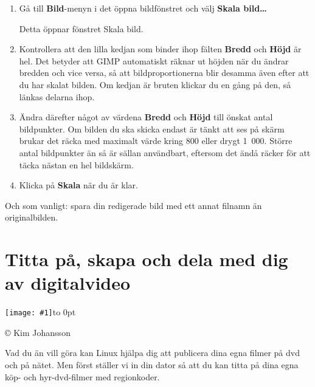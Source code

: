 \documentclass[a4paper,final]{memoir} %
\newcommand{\xrcredit}[1]{\hbox to 0pt{\hspace*{.6\baselineskip}\begin{rotate}{90}{\usefont{T1}{phv}{m}{n}\selectfont\tiny #1}\end{rotate}}}
\newcommand\xintropic[1]{{\texttt{[image: \#1]}\xrcredit{\copyright{} Kim Johansson}}\medskip}
\newcommand\xchapter[2]{\chapter{#2}\begin{center}\xintropic{#1}\end{center}}
\begin{document}
\begin{enumerate}

\item Gå till \textbf{Bild}-menyn i det öppna bildfönstret och välj \textbf{Skala bild\ldots{}}


Detta öppnar fönstret Skala bild. 

\item Kontrollera att den lilla kedjan som binder ihop fälten \textbf{Bredd} och \textbf{Höjd} är hel. Det betyder att GIMP automatiskt räknar ut höjden när du ändrar bredden och vice versa, så att bildproportionerna blir desamma även efter att du har skalat bilden. Om kedjan är bruten klickar du en gång på den, så länkas delarna ihop. 

\item Ändra därefter något av värdena \textbf{Bredd} och \textbf{Höjd} till önskat antal bildpunkter. Om bilden du ska skicka endast är tänkt att ses på skärm brukar det räcka med maximalt värde kring 800 eller drygt 1~000. Större antal bildpunkter än så är sällan användbart, eftersom det ändå räcker för att täcka nästan en hel bildskärm.

\item Klicka på \textbf{Skala} när du är klar. 
\end{enumerate}

Och som vanligt: spara din redigerade bild med ett annat filnamn än originalbilden.


\xchapter{bilder804-all/Titta_pa_och_skapa_digitalvideo}{Titta på, skapa och dela med dig av digitalvideo}\label{cha:dv}



Vad du än vill göra kan Linux hjälpa dig att publicera dina egna filmer på dvd och på nätet. Men först ställer vi in din dator så att du kan titta på dina egna köp- och hyr-dvd-filmer med regionkoder.
\end{document}
